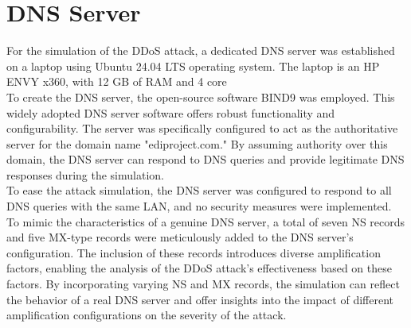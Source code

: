 \section{DNS Server}
For the simulation of the DDoS attack, a dedicated DNS server was established on a laptop using Ubuntu 24.04 LTS operating system.
The laptop is an HP ENVY x360, with 12 GB of RAM and 4 core\\
To create the DNS server, the open-source software BIND9 was employed. This widely adopted DNS server software offers robust functionality and configurability.
The server was specifically configured to act as the authoritative server for the domain name "ediproject.com."
By assuming authority over this domain, the DNS server can respond to DNS queries and provide legitimate DNS responses during the simulation.\\
To ease the attack simulation, the DNS server was configured to respond to all DNS queries with the same LAN, and no security measures were implemented.
To mimic the characteristics of a genuine DNS server, a total of seven NS records and five MX-type records were meticulously added to the DNS server's configuration.
The inclusion of these records introduces diverse amplification factors, enabling the analysis of the DDoS attack's effectiveness based on these factors.
By incorporating varying NS and MX records, the simulation can reflect the behavior of a real DNS server and offer insights into the impact of
different amplification configurations on the severity of the attack.\\
